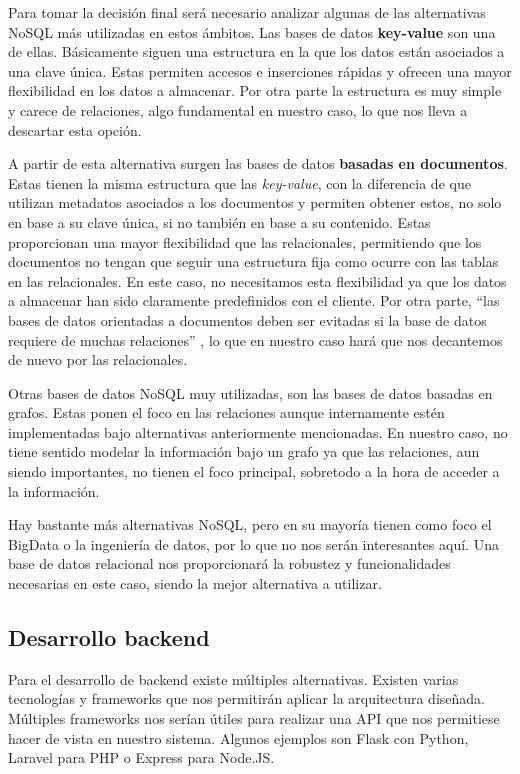 Para tomar la decisión final será necesario analizar algunas de las alternativas NoSQL más utilizadas en estos ámbitos. Las bases de datos \textbf{key-value} son una de ellas. Básicamente siguen una estructura en la que los datos están asociados a una clave única. Estas permiten accesos e inserciones rápidas y ofrecen una mayor flexibilidad en los datos a almacenar. Por otra parte la estructura es muy simple y carece de relaciones, algo fundamental en nuestro caso, lo que nos lleva a descartar esta opción.

A partir de esta alternativa surgen las bases de datos \textbf{basadas en documentos}. Estas tienen la misma estructura que las \textit{key-value}, con la diferencia de que utilizan metadatos asociados a los documentos y permiten obtener estos, no solo en base a su clave única, si no también en base a su contenido. Estas proporcionan una mayor flexibilidad que las relacionales, permitiendo que los documentos no tengan que seguir una estructura fija como ocurre con las tablas en las relacionales. En este caso, no necesitamos esta flexibilidad ya que los datos a almacenar han sido claramente predefinidos con el cliente. Por otra parte, ``las bases de datos orientadas a documentos deben ser evitadas si la base de datos requiere de muchas relaciones'' \cite{NoSQLvsSQL_2}, lo que en nuestro caso hará que nos decantemos de nuevo por las relacionales.

Otras bases de datos NoSQL muy utilizadas, son las bases de datos basadas en grafos. Estas ponen el foco en las relaciones aunque internamente estén implementadas bajo alternativas anteriormente mencionadas. En nuestro caso, no tiene sentido modelar la información bajo un grafo ya que las relaciones, aun siendo importantes, no tienen el foco principal, sobretodo a la hora de acceder a la información.

Hay bastante más alternativas NoSQL, pero en su mayoría tienen como foco el BigData o la ingeniería de datos, por lo que no nos serán interesantes aquí. Una base de datos relacional nos proporcionará la robustez y funcionalidades necesarias en este caso, siendo la mejor alternativa a utilizar.

\subsection{Desarrollo backend}

Para el desarrollo de backend existe múltiples alternativas. Existen varias tecnologías y frameworks que nos permitirán aplicar la arquitectura diseñada. Múltiples frameworks nos serían útiles para realizar una API que nos permitiese hacer de vista en nuestro sistema. Algunos ejemplos son Flask con Python, Laravel para PHP o Express para Node.JS. 

